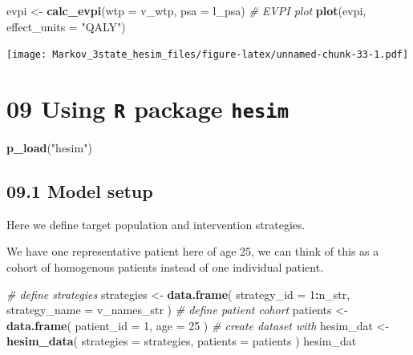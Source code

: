 \documentclass[
]{article}
\newenvironment{Shaded}{\begin{snugshade}}{\end{snugshade}}
\newcommand{\CommentTok}[1]{\textcolor[rgb]{0.56,0.35,0.01}{\textit{#1}}}
\newcommand{\DataTypeTok}[1]{\textcolor[rgb]{0.13,0.29,0.53}{#1}}
\newcommand{\DecValTok}[1]{\textcolor[rgb]{0.00,0.00,0.81}{#1}}
\newcommand{\KeywordTok}[1]{\textcolor[rgb]{0.13,0.29,0.53}{\textbf{#1}}}
\newcommand{\NormalTok}[1]{#1}
\newcommand{\OperatorTok}[1]{\textcolor[rgb]{0.81,0.36,0.00}{\textbf{#1}}}
\newcommand{\StringTok}[1]{\textcolor[rgb]{0.31,0.60,0.02}{#1}}
\begin{document}
\begin{Shaded}
\begin{Highlighting}[]
\NormalTok{evpi <-}\StringTok{ }\KeywordTok{calc_evpi}\NormalTok{(}\DataTypeTok{wtp =}\NormalTok{ v_wtp, }\DataTypeTok{psa =}\NormalTok{ l_psa)}
\CommentTok{# EVPI plot}
\KeywordTok{plot}\NormalTok{(evpi, }\DataTypeTok{effect_units =} \StringTok{"QALY"}\NormalTok{)}
\end{Highlighting}
\end{Shaded}

\texttt{[image: Markov\_3state\_hesim\_files/figure-latex/unnamed-chunk-33-1.pdf]}

\hypertarget{using-r-package-hesim}{%
\section{\texorpdfstring{09 Using \texttt{R} package
\texttt{hesim}}{09 Using R package hesim}}\label{using-r-package-hesim}}

\begin{Shaded}
\begin{Highlighting}[]
\KeywordTok{p_load}\NormalTok{(}\StringTok{"hesim"}\NormalTok{)}
\end{Highlighting}
\end{Shaded}

\hypertarget{model-setup}{%
\subsection{09.1 Model setup}\label{model-setup}}

Here we define target population and intervention strategies.

We have one representative patient here of age 25, we can think of this
as a cohort of homogenous patients instead of one individual patient.

\begin{Shaded}
\begin{Highlighting}[]
\CommentTok{# define strategies}
\NormalTok{strategies <-}\StringTok{ }\KeywordTok{data.frame}\NormalTok{(}
  \DataTypeTok{strategy_id   =} \DecValTok{1}\OperatorTok{:}\NormalTok{n_str,}
  \DataTypeTok{strategy_name =}\NormalTok{ v_names_str}
\NormalTok{  )}
\CommentTok{# define patient cohort}
\NormalTok{patients <-}\StringTok{ }\KeywordTok{data.frame}\NormalTok{(}
  \DataTypeTok{patient_id =} \DecValTok{1}\NormalTok{,}
  \DataTypeTok{age        =} \DecValTok{25}
\NormalTok{)}
\CommentTok{# create dataset with }
\NormalTok{hesim_dat <-}\StringTok{ }\KeywordTok{hesim_data}\NormalTok{(}
  \DataTypeTok{strategies =}\NormalTok{ strategies,}
  \DataTypeTok{patients   =}\NormalTok{ patients}
\NormalTok{)}
\NormalTok{hesim_dat}
\end{Highlighting}
\end{Shaded}
\end{document}
